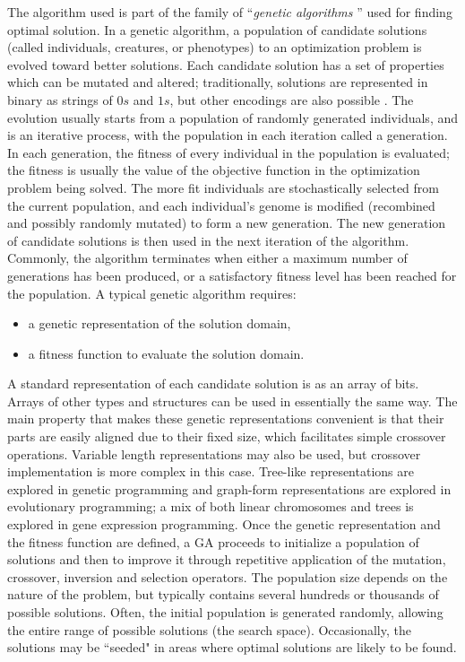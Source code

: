 The algorithm used is part of the family of ``\emph{genetic algorithms} \cite{wiki:xxx}'' used for finding optimal solution.
In a genetic algorithm, a population of candidate solutions (called individuals, creatures, or phenotypes) to an optimization problem is evolved toward better solutions. Each candidate solution has a set of properties which can be mutated and altered; traditionally, solutions are represented in binary as strings of $0s$ and $1s$, but other encodings are also possible \cite{Whitley1994}.
The evolution usually starts from a population of randomly generated individuals, and is an iterative process, with the population in each iteration called a generation. In each generation, the fitness of every individual in the population is evaluated; the fitness is usually the value of the objective function in the optimization problem being solved. The more fit individuals are stochastically selected from the current population, and each individual's genome is modified (recombined and possibly randomly mutated) to form a new generation. The new generation of candidate solutions is then used in the next iteration of the algorithm. Commonly, the algorithm terminates when either a maximum number of generations has been produced, or a satisfactory fitness level has been reached for the population.
A typical genetic algorithm requires:
\begin{itemize}
\item a genetic representation of the solution domain,
\item a fitness function to evaluate the solution domain.
\end{itemize}
A standard representation of each candidate solution is as an array of bits\cite{Whitley1994}. Arrays of other types and structures can be used in essentially the same way. The main property that makes these genetic representations convenient is that their parts are easily aligned due to their fixed size, which facilitates simple crossover operations. Variable length representations may also be used, but crossover implementation is more complex in this case. Tree-like representations are explored in genetic programming and graph-form representations are explored in evolutionary programming; a mix of both linear chromosomes and trees is explored in gene expression programming.
Once the genetic representation and the fitness function are defined, a GA proceeds to initialize a population of solutions and then to improve it through repetitive application of the mutation, crossover, inversion and selection operators.
The population size depends on the nature of the problem, but typically contains several hundreds or thousands of possible solutions. Often, the initial population is generated randomly, allowing the entire range of possible solutions (the search space). Occasionally, the solutions may be ``seeded" in areas where optimal solutions are likely to be found.
